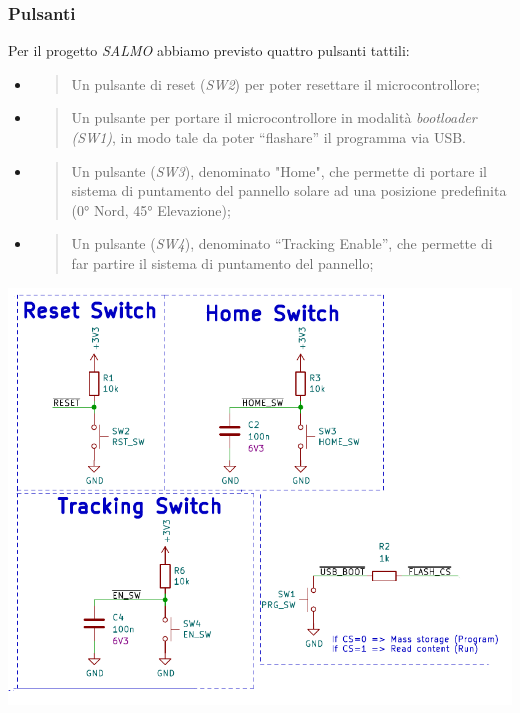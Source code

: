 \hypertarget{pulsanti}{%
\subsubsection{\texorpdfstring{\hfill\break
Pulsanti}{ Pulsanti}}\label{pulsanti}}

Per il progetto \emph{SALMO} abbiamo previsto quattro pulsanti tattili:

\begin{itemize}
\item
  \begin{quote}
  Un pulsante di reset (\emph{SW2}) per poter resettare il
  microcontrollore;
  \end{quote}
\item
  \begin{quote}
  Un pulsante per portare il microcontrollore in modalità
  \emph{bootloader (SW1)}, in modo tale da poter ``flashare'' il
  programma via USB.
  \end{quote}
\item
  \begin{quote}
  Un pulsante (\emph{SW3}), denominato "Home", che permette di portare
  il sistema di puntamento del pannello solare ad una posizione
  predefinita (0° Nord, 45° Elevazione);
  \end{quote}
\item
  \begin{quote}
  Un pulsante (\emph{SW4}), denominato ``Tracking Enable'', che permette
  di far partire il sistema di puntamento del pannello;
  \end{quote}
\end{itemize}

\begin{center}
\includegraphics[scale=0.5]{figures/image16.png}
\captionsetup{type=figure}
\end{center}

